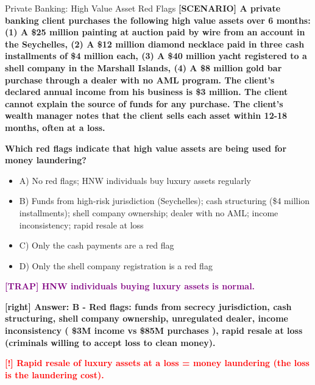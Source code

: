 \documentclass[11pt,a4paper]{beamer}
\newcommand{\redflag}[1]{\textcolor{red}{\textbf{[!] #1}}}
\newcommand{\trap}[1]{\textcolor{purple}{\textbf{[TRAP] #1}}}
\newcommand{\correct}[1]{\textcolor{green!50!black}{\textbf{[right] #1}}}
\newcommand{\scenario}[1]{\textcolor{blue!70!black}{\textbf{[SCENARIO] #1}}}
\begin{document}
	
	\begin{frame}{Private Banking: High Value Asset Red Flags}
		\tiny
		\scenario{A private banking client purchases the following high value assets over 6 months: (1) A \$25 million painting at auction paid by wire from an account in the Seychelles, (2) A \$12 million diamond necklace paid in three cash installments of \$4 million each, (3) A \$40 million yacht registered to a shell company in the Marshall Islands, (4) A \$8 million gold bar purchase through a dealer with no AML program. The client's declared annual income from his business is \$3 million. The client cannot explain the source of funds for any purchase. The client's wealth manager notes that the client sells each asset within 12-18 months, often at a loss.}
		
		\vspace{0.02cm}
		\textbf{Which red flags indicate that high value assets are being used for money laundering?}
		\vspace{0.02cm}
		
		\begin{itemize}
			\item A) No red flags; HNW individuals buy luxury assets regularly
			\item B) Funds from high-risk jurisdiction (Seychelles); cash structuring (\$4 million installments); shell company ownership; dealer with no AML; income inconsistency; rapid resale at loss
			\item C) Only the cash payments are a red flag
			\item D) Only the shell company registration is a red flag
		\end{itemize}
		
		\vspace{0.02cm}
		\trap{HNW individuals buying luxury assets is normal.}
		
		\vspace{0.02cm}
		\correct{Answer: B - Red flags: funds from secrecy jurisdiction, cash structuring, shell company ownership, unregulated dealer, income inconsistency ( \$3M income vs \$85M purchases ), rapid resale at loss (criminals willing to accept loss to clean money).}
		
		\vspace{0.02cm}
		\redflag{Rapid resale of luxury assets at a loss = money laundering (the loss is the laundering cost).}
	\end{frame}
	
\end{document}
